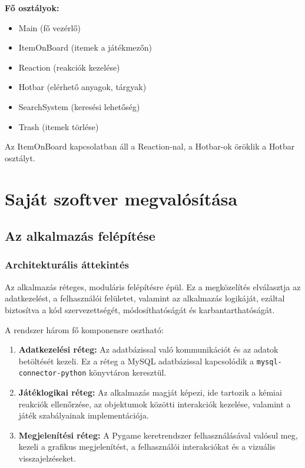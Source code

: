 \documentclass[]{thesis-ekf}
\begin{document}
	\textbf{Fő osztályok:}
	\begin{itemize}
		\item Main (fő vezérlő)
		\item ItemOnBoard (itemek a játékmezőn)
		\item Reaction (reakciók kezelése)
		\item Hotbar (elérhető anyagok, tárgyak)
		\item SearchSystem (keresési lehetőség)
		\item Trash (itemek törlése)
	\end{itemize}
	Az ItemOnBoard kapcsolatban áll a Reaction-nal, a Hotbar-ok öröklik a Hotbar osztályt.

	\chapter{Saját szoftver megvalósítása} 
	\section{Az alkalmazás felépítése}
	
	\subsection{Architekturális áttekintés}
	
	Az alkalmazás réteges, moduláris felépítésre épül. Ez a megközelítés elválasztja az adatkezelést, a felhasználói felületet, valamint az alkalmazás logikáját, ezáltal biztosítva a kód szervezettségét, módosíthatóságát és karbantarthatóságát.
	
	A rendszer három fő komponensre osztható:
	
	\begin{enumerate}
		\item \textbf{Adatkezelési réteg:} Az adatbázissal való kommunikációt és az adatok betöltését kezeli. Ez a réteg a MySQL adatbázissal kapcsolódik a \texttt{mysql-connector-python} könyvtáron keresztül.
		
		\item \textbf{Játéklogikai réteg:} Az alkalmazás magját képezi, ide tartozik a kémiai reakciók ellenőrzése, az objektumok közötti interakciók kezelése, valamint a játék szabályainak implementációja.
		
		\item \textbf{Megjelenítési réteg:} A Pygame keretrendszer felhasználásával valósul meg, kezeli a grafikus megjelenítést, a felhasználói interakciókat és a vizuális visszajelzéseket.
	\end{enumerate}
	
\end{document}
